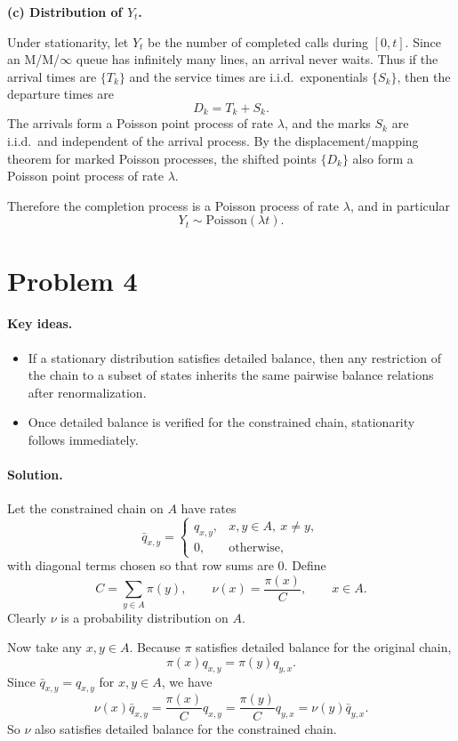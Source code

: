 \documentclass[11pt]{article}
\newcommand{\1}{\mathbf{1}}
\begin{document}
\textbf{(c) Distribution of \(Y_t\).}

Under stationarity, let \(Y_t\) be the number of completed calls during \([0,t]\). Since an M/M/\(\infty\) queue has infinitely many lines, an arrival never waits. Thus if the arrival times are \(\{T_k\}\) and the service times are i.i.d.\ exponentials \(\{S_k\}\), then the departure times are
\[
    D_k = T_k + S_k.
\]
The arrivals form a Poisson point process of rate \(\lambda\), and the marks \(S_k\) are i.i.d.\ and independent of the arrival process. By the displacement/mapping theorem for marked Poisson processes, the shifted points \(\{D_k\}\) also form a Poisson point process of rate \(\lambda\).

Therefore the completion process is a Poisson process of rate \(\lambda\), and in particular
\[
    Y_t \sim \mathrm{Poisson}(\lambda t).
\]

\section*{Problem 4}
\paragraph{Key ideas.}
\begin{itemize}
    \item If a stationary distribution satisfies detailed balance, then any restriction of the chain to a subset of states inherits the same pairwise balance relations after renormalization.
    \item Once detailed balance is verified for the constrained chain, stationarity follows immediately.
\end{itemize}

\paragraph{Solution.}
Let the constrained chain on \(A\) have rates
\[
    \bar q_{x,y} =
    \begin{cases}
        q_{x,y}, & x,y \in A,\ x\ne y,\\
        0, & \text{otherwise},
    \end{cases}
\]
with diagonal terms chosen so that row sums are \(0\). Define
\[
    C = \sum_{y \in A}\pi(y),
    \qquad
    \nu(x)=\frac{\pi(x)}{C}, \qquad x \in A.
\]
Clearly \(\nu\) is a probability distribution on \(A\).

Now take any \(x,y \in A\). Because \(\pi\) satisfies detailed balance for the original chain,
\[
    \pi(x)q_{x,y} = \pi(y)q_{y,x}.
\]
Since \(\bar q_{x,y}=q_{x,y}\) for \(x,y \in A\), we have
\[
    \nu(x)\bar q_{x,y}
    =
    \frac{\pi(x)}{C} q_{x,y}
    =
    \frac{\pi(y)}{C} q_{y,x}
    =
    \nu(y)\bar q_{y,x}.
\]
So \(\nu\) also satisfies detailed balance for the constrained chain.
\end{document}
